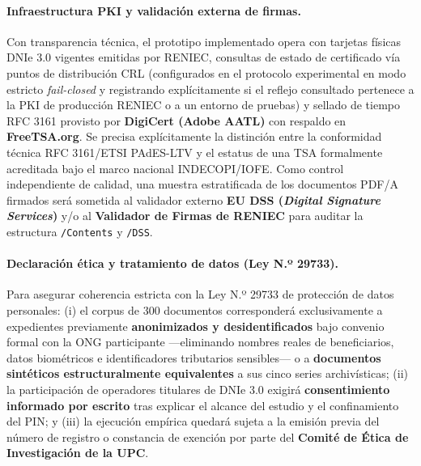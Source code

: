 \documentclass[runningheads,twocolumn]{llncs}
\begin{document}
\paragraph{Infraestructura PKI y validación externa de firmas.} Con transparencia técnica, el prototipo implementado opera con tarjetas físicas DNIe 3.0 vigentes emitidas por RENIEC, consultas de estado de certificado vía puntos de distribución CRL (configurados en el protocolo experimental en modo estricto \textit{fail-closed} y registrando explícitamente si el reflejo consultado pertenece a la PKI de producción RENIEC o a un entorno de pruebas) y sellado de tiempo RFC 3161 provisto por \textbf{DigiCert (Adobe AATL)} con respaldo en \textbf{FreeTSA.org}. Se precisa explícitamente la distinción entre la conformidad técnica RFC 3161/ETSI PAdES-LTV y el estatus de una TSA formalmente acreditada bajo el marco nacional INDECOPI/IOFE. Como control independiente de calidad, una muestra estratificada de los documentos PDF/A firmados será sometida al validador externo \textbf{EU DSS (\textit{Digital Signature Services})} y/o al \textbf{Validador de Firmas de RENIEC} para auditar la estructura \texttt{/Contents} y \texttt{/DSS}.

\paragraph{Declaración ética y tratamiento de datos (Ley N.º 29733).} Para asegurar coherencia estricta con la Ley N.º 29733 \cite{ley29733} de protección de datos personales: (i) el corpus de 300 documentos corresponderá exclusivamente a expedientes previamente \textbf{anonimizados y desidentificados} bajo convenio formal con la ONG participante ---eliminando nombres reales de beneficiarios, datos biométricos e identificadores tributarios sensibles--- o a \textbf{documentos sintéticos estructuralmente equivalentes} a sus cinco series archivísticas; (ii) la participación de operadores titulares de DNIe 3.0 exigirá \textbf{consentimiento informado por escrito} tras explicar el alcance del estudio y el confinamiento del PIN; y (iii) la ejecución empírica quedará sujeta a la emisión previa del número de registro o constancia de exención por parte del \textbf{Comité de Ética de Investigación de la UPC}.
\end{document}
